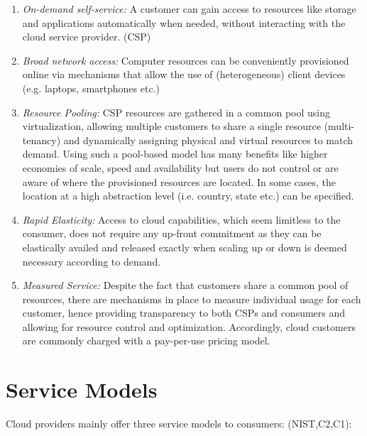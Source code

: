 \begin{enumerate} [I]
	\item \textit{On-demand self-service:} A customer can gain access to resources like storage and applications automatically when needed, without interacting with the cloud service provider. (CSP) 
	
	\item \textit{Broad network access:} Computer resources can be conveniently provisioned online via mechanisms that allow the use of (heterogeneous) client devices (e.g. laptops, smartphones etc.) 
	
	\item \textit{Resource Pooling:} CSP resources are gathered in a common pool using virtualization, allowing multiple customers to share a single resource (multi-tenancy) and dynamically assigning physical and virtual resources to match demand. Using such a pool-based model has many benefits like higher economies of scale, speed and availability but users do not control or are aware of where the provisioned resources are located. In some cases, the location at a high abstraction level (i.e. country, state etc.) can be specified. 
	
	\item \textit{Rapid Elasticity:} Access to cloud capabilities, which seem limitless to the consumer, does not require any up-front commitment as they can be elastically availed and released exactly when scaling up or down is deemed necessary according to demand. 
	
	\item \textit{Measured Service:} Despite the fact that customers share a common pool of resources, there are mechanisms in place to measure individual usage for each customer, hence providing transparency to both CSPs and consumers and allowing for resource control and optimization. Accordingly, cloud customers are commonly charged with a pay-per-use pricing model.
\end{enumerate}


\section{Service Models}
Cloud providers mainly offer three service models to consumers: (NIST,C2,C1):

